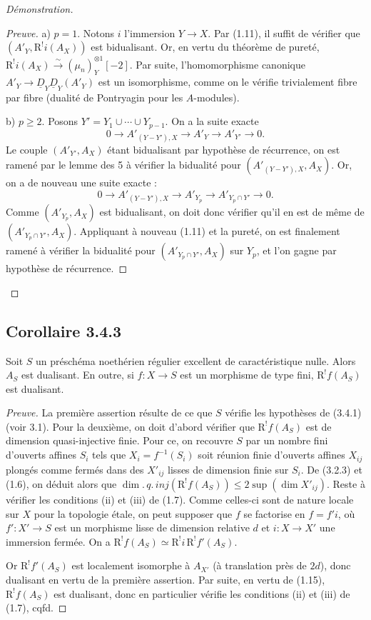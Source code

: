 \documentclass[11pt]{article}
\newcommand{\R}{\mathrm{R}}
\providecommand{\R}{\mathrm R}
\begin{document}
\begin{proof}[Démonstration]
\begin{proof}[Preuve]
a) $p = 1$. Notons $i$ l'immersion $Y \to X$. Par (1.11), il suffit de vérifier que $(A'_Y, \R^{!}i(A_X))$ est bidualisant. Or, en vertu du théorème de pureté, $\R^{!}i(A_X) \xrightarrow{\sim} (\mu_n)^{\otimes 1}_Y[-2]$. Par suite, l'homomorphisme canonique $A'_Y \to \underline{D}_Y \underline{D}_Y(A'_Y)$ est un isomorphisme, comme on le vérifie trivialement fibre par fibre (dualité de Pontryagin pour les $A$-modules).

b) $p \geqslant 2$. Posons $Y' = Y_1 \cup \cdots \cup Y_{p-1}$. On a la suite exacte
\[
0 \longrightarrow A'_{(Y-Y'),X} \longrightarrow A'_Y \longrightarrow A'_{Y'} \longrightarrow 0.
\]
Le couple $(A'_{Y'}, A_X)$ étant bidualisant par hypothèse de récurrence, on est ramené par le lemme des 5 à vérifier la bidualité pour $(A'_{(Y-Y'),X}, A_X)$. Or, on a de nouveau une suite exacte :
\[
0 \longrightarrow A'_{(Y-Y'),X} \longrightarrow A'_{Y_p} \longrightarrow A'_{Y_p \cap Y'} \longrightarrow 0.
\]
Comme $(A'_{Y_p}, A_X)$ est bidualisant, on doit donc vérifier qu'il en est de même de $(A'_{Y_p \cap Y'}, A_X)$. Appliquant à nouveau (1.11) et la pureté, on est finalement ramené à vérifier la bidualité pour $(A'_{Y_p \cap Y'}, A_X)$ sur $Y_p$, et l'on gagne par hypothèse de récurrence.
\end{proof}
\end{proof}

\subsection*{Corollaire 3.4.3}
Soit $S$ un préschéma noethérien régulier excellent de caractéristique nulle. Alors $A_S$ est dualisant. En outre, si $f : X \to S$ est un morphisme de type fini, $\R^{!}f(A_S)$ est dualisant.

\begin{proof}[Preuve]
La première assertion résulte de ce que $S$ vérifie les hypothèses de (3.4.1) (voir 3.1). Pour la deuxième, on doit d'abord vérifier que $\R^{!}f(A_S)$ est de dimension quasi-injective finie. Pour ce, on recouvre $S$ par un nombre fini d'ouverts affines $S_i$ tels que $X_i = f^{-1}(S_i)$ soit réunion finie d'ouverts affines $X_{ij}$ plongés comme fermés dans des $X'_{ij}$ lisses de dimension finie sur $S_i$. De (3.2.3) et (1.6), on déduit alors que $\dim.\,q.\,inj(\R^{!}f(A_S)) \leqslant 2\sup(\dim X'_{ij})$. Reste à vérifier les conditions (ii) et (iii) de (1.7). Comme celles-ci sont de nature locale sur $X$ pour la topologie étale, on peut supposer que $f$ se factorise en $f = f'i$, où $f' : X' \to S$ est un morphisme lisse de dimension relative $d$ et $i : X \to X'$ une immersion fermée. On a $\R^{!}f(A_S) \simeq \R^{!}i \, \R^{!}f'(A_S)$.

Or $\R^{!}f'(A_S)$ est localement isomorphe à $A_{X'}$ (à translation près de $2d$), donc dualisant en vertu de la première assertion. Par suite, en vertu de (1.15), $\R^{!}f(A_S)$ est dualisant, donc en particulier vérifie les conditions (ii) et (iii) de (1.7), cqfd.
\end{proof}
\end{document}
